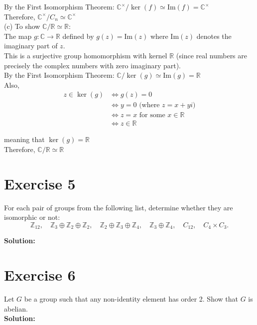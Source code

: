\documentclass{article}
\begin{document}
By the First Isomorphism Theorem:
$\mathbb{C}^\times/\ker(f) \simeq \text{Im}(f) = \mathbb{C}^\times$ \\

Therefore, $\mathbb{C}^\times/C_n \simeq \mathbb{C}^\times$ \\

(c) To show $\mathbb{C}/\mathbb{R} \simeq \mathbb{R}$: \\

The map $g: \mathbb{C} \to \mathbb{R}$ defined by $g(z) = \text{Im}(z)$
where $\text{Im}(z)$ denotes the imaginary part of $z$. \\

This is a surjective group homomorphism with kernel $\mathbb{R}$
(since real numbers are precisely the complex numbers with zero imaginary part). \\

By the First Isomorphism Theorem:
$\mathbb{C}/\ker(g) \simeq \text{Im}(g) = \mathbb{R}$ \\

Also,
\begin{align*}
   z \in \ker(g) &\iff g(z) = 0 \\
   &\iff y = 0 \text{ (where $z = x + yi$)} \\
   &\iff z = x \text{ for some $x \in \mathbb{R}$} \\
   &\iff z \in \mathbb{R}
\end{align*}

meaning that $\ker(g) = \mathbb{R}$ \\

Therefore, $\mathbb{C}/\mathbb{R} \simeq \mathbb{R}$

\newpage

\section*{Exercise 5}
For each pair of groups from the following list, determine whether they are isomorphic or not:
\[ \mathbb{Z}_{12}, \quad \mathbb{Z}_3 \oplus \mathbb{Z}_2 \oplus \mathbb{Z}_2, \quad \mathbb{Z}_2 \oplus \mathbb{Z}_3 \oplus \mathbb{Z}_4, \quad \mathbb{Z}_3 \oplus \mathbb{Z}_4, \quad C_{12}, \quad C_4 \times C_3. \]

\textbf{Solution:} \\



\newpage

\section*{Exercise 6}
Let $G$ be a group such that any non-identity element has order 2. Show that $G$ is abelian. \\

\textbf{Solution:} \\
\end{document}
